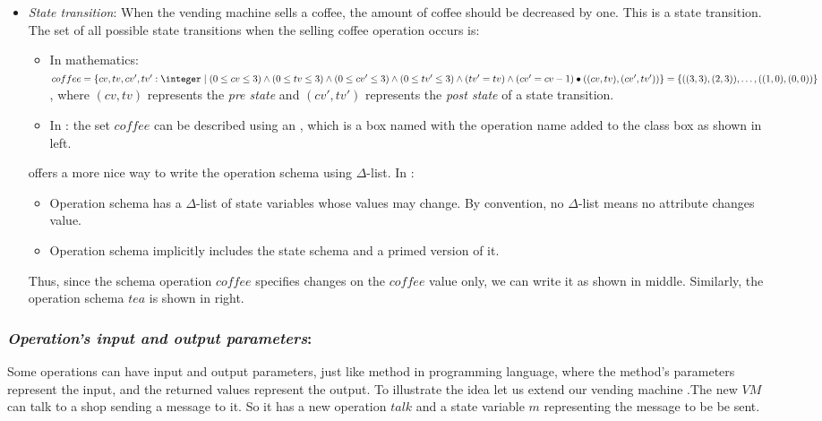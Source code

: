 \begin{itemize}
\item \textit{State transition}: When the vending machine sells a coffee, the amount of coffee should be decreased by one. This is a state transition.
The set of all possible state transitions when the selling coffee operation occurs is:
\begin{itemize}
\item In mathematics: $coffee =\{cv,tv,cv',tv': \integer\mid (0 \leq  cv \leq 3) \wedge
(0 \leq  tv \leq 3)\wedge (0 \leq  cv' \leq 3) \wedge (0 \leq  tv' \leq 3)\wedge (tv' = tv) \wedge (cv' = cv - 1) \bullet\pair{\pair{cv}{tv}}{\pair{cv'}{tv'}}\}  =\{\pair{\pair{3}{3}}{\pair{2}{3}},\dots,\pair{\pair{1}{0}}{\pair{0}{0}}\}$, where $(cv,tv)$ represents the \textit{pre state} and $(cv',tv')$ represents the \textit{post state} of a state transition.
\item In \oz{}: the set $coffee$ can be described using an , which is a box named with the operation name added to the class box as shown in  left.
\end{itemize}



\oz{} offers a more nice way to write the operation schema using $\Delta$-list. In \oz{}:
\begin{itemize}
\item Operation schema has a $\Delta$-list of state variables
whose values may change. By convention, no $\Delta$-list means
no attribute changes value.
\item Operation schema implicitly
includes the state schema and a primed version of it.
\end{itemize}
Thus, since the schema operation $coffee$ specifies changes on the $coffee$ value only, we can write it as shown in  middle. 
Similarly, the operation schema $tea$ is shown in  right.
\end{itemize}

\subsubsection{\textit{Operation's input and output parameters}:} 
\label{operation_input_output_parameters} 
Some operations can have input and output parameters, just like method in programming language, where the method's parameters represent the input, and the returned values represent the output. To illustrate the idea let us extend our vending machine .The new $VM$ can talk to a shop sending a message to it. So it has a new operation $talk$ and a state variable $m$ representing the message to be be sent.


